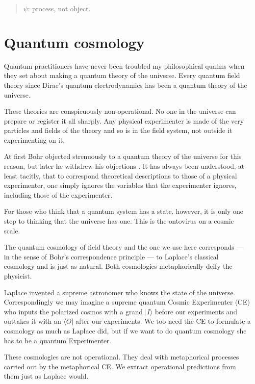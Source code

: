 \documentclass[a4paper,11pt]{article}
\begin{document}
\begin{quotation}
$\psi$:  process, not object.
 \end{quotation}


\part{Quantum cosmology}

Quantum practitioners have never been troubled my
philosophical qualms when they set about making a 
quantum theory of the universe.
Every quantum field theory since Dirac's quantum
electrodynamics has been 
a 
quantum theory of the universe.

These theories are conspicuously non-operational.
No one in the universe
can prepare or register it all sharply.
Any physical experimenter is made of the very 
particles and fields of the theory
and so is in the field system,
not outside it experimenting on it.

At first Bohr objected strenuously to a quantum theory
of the universe for this reason, but later he 
withdrew his objections \cite{BOHR}.
It has always been understood,
at least tacitly,
that to correspond theoretical descriptions to those
of a physical experimenter,
one simply ignores the variables that
the experimenter ignores,
including those of the experimenter.

For those who think that a quantum system has a state,
however,
it is only one step to thinking that the universe has one.
This is the ontovirus on a cosmic scale.


The  quantum cosmology
of field theory
and the one we use here
corresponds 
--- in the sense of Bohr's correspondence principle ---
to
Laplace's classical cosmology
and is just as natural.
Both cosmologies  metaphorically deify the physicist.

Laplace invented a supreme astronomer 
who knows the state of the universe.
Correspondingly
we may imagine a supreme quantum Cosmic Experimenter (CE)
who
inputs the polarized cosmos with a grand $|I\rangle$ 
before our experiments
and outtakes it with an $\langle O|$ after our experiments.
We too need the CE
to formulate a cosmology as much as Laplace did,
but if we want to do quantum cosmology she has to be a quantum 
Experimenter.



These cosmologies are not operational.
They deal with metaphorical processes carried out by 
the metaphorical CE.
We extract  operational predictions
from them just as Laplace would.
\end{document}
